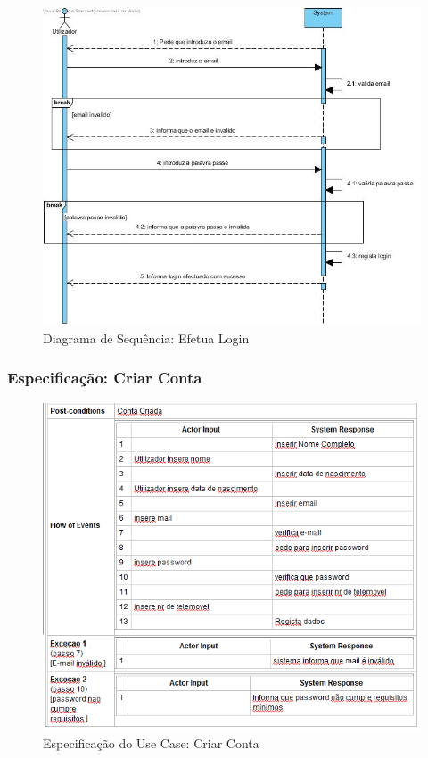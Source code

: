 \begin{figure}[htb!]
	\centering
	\includegraphics[scale=0.5]{imagens/diagramaSeq/Login}  
	\caption{Diagrama de Sequência: Efetua Login }  
\end{figure}



\newpage

\subsubsection{Especificação: Criar Conta }
\begin{figure}[htb!]
	\centering
	\includegraphics[scale=0.6]{imagens/Especificacoes/criarconta}  
	\caption{Especificação do Use Case: Criar Conta   }  
\end{figure}

